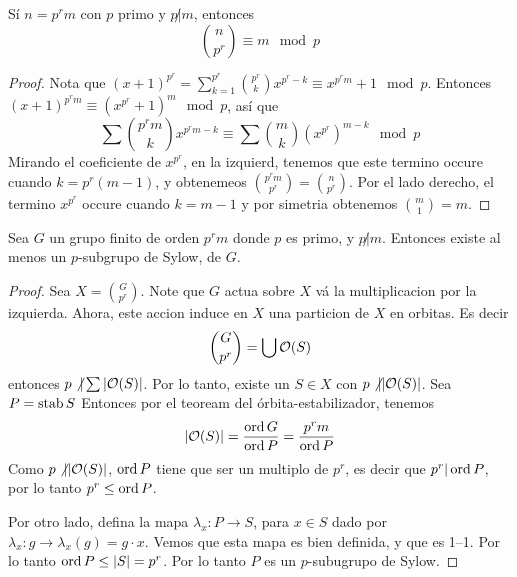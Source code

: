 \begin{lemma}\label{8.32}
    S\'i $n=p^rm$ con  $p$ primo y  $p \not| m$, entonces
    \begin{equation*}
        {n \choose p^r} \equiv m \mod{p}
    \end{equation*}
\end{lemma}
\begin{proof}
    Nota que $(x+1)^{p^r}=\sum_{k=1}^{p^r}{{p^r \choose k}x^{p^r-k}}
    \equiv x^{p^rm}+1 \mod{p}$. Entonces $(x+1)^{p^rm} \equiv (x^{p^r}+1)^m
    \mod{p}$, as\'i que
    \begin{equation*}
        \sum{{p^rm \choose k}x^{p^rm-k}} \equiv \sum{{m \choose
        k}(x^{p^r})^{m-k}} \mod{p}
    \end{equation*}
    Mirando el coeficiente de $x^{p^r}$, en la izquierd, tenemos que este
    termino occure cuando $k=p^r(m-1)$, y obtenemeos ${p^rm \choose p^r}={n
    \choose p^r}$. Por el lado derecho, el termino $x^{p^r}$ occure cuando
    $k=m-1$ y por simetria obtenemos ${m \choose 1}=m$.
\end{proof}

\begin{theorem}\label{8.33}
    Sea $G$ un grupo finito de orden  $p^rm$ donde  $p$ es primo, y  $p \not|
    m$. Entonces existe al menos un  $p$-subgrupo de Sylow, de  $G$.
\end{theorem}
\begin{proof}
    Sea $X={G \choose p^r}$. Note que $G$ actua sobre  $X$ v\'a la
    multiplicacion por la izquierda. Ahora, este accion induce en  $X$ una
    particion de  $X$ en orbitas. Es decir
    \begin{equation*}
        {G \choose p^r}=\bigcup{\mathcal{O}(S)}
    \end{equation*}
    entonces $p \not| \sum{|\mathcal{O}(S)|}$. Por lo tanto, existe un $S \in X$ con $p
    \not| |\mathcal{O}(S)|$. Sea $P=\operatorname{stab}{S}$ Entonces por el teoream del
    \'orbita-estabilizador, tenemos
    \begin{equation*}
        |\mathcal{O}(S)|=\frac{\operatorname{ord}{G}}{\operatorname{ord}{P}}=\frac{p^rm}{\operatorname{ord}{P}}
    \end{equation*}
    Como $p \not| |\mathcal{O}(S)|$, $\operatorname{ord}{P}$ tiene que ser un multiplo de $p^r$, es
    decir que $p^r | \operatorname{ord}{P}$, por lo tanto $p^r \leq \operatorname{ord}{P}$.

    Por otro lado, defina la mapa $\lambda_x:P \xrightarrow{} S$, para $x \in S$
    dado por $\lambda_x:g \xrightarrow{} \lambda_x(g)=g \cdot x$. Vemos que esta
    mapa es bien definida, y que es 1--1. Por lo tanto $\operatorname{ord}{P} \leq |S|=p^r$.
    Por lo tanto $P$ es un  $p$-subugrupo de Sylow.
\end{proof}

